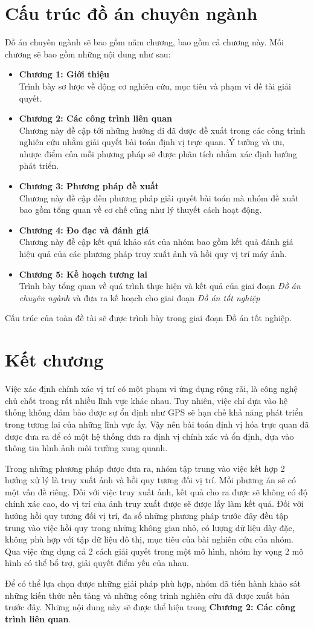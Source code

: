 \section{Cấu trúc đồ án chuyên ngành}
Đồ án chuyên ngành sẽ bao gồm năm chương, bao gồm cả chương này. Mỗi chương sẽ bao gồm những nội dung như sau:
\begin{itemize}
    \item \textbf{Chương 1: Giới thiệu} \\
    Trình bày sơ lược về động cơ nghiên cứu, mục tiêu và phạm vi đề tài giải quyết.
    \item \textbf{Chương 2: Các công trình liên quan} \\
    Chương này đề cập tới những hướng đi đã được đề xuất trong các công trình nghiên cứu nhằm giải quyết bài toán định vị trực quan. Ý tưởng và ưu, nhược điểm của mỗi phương pháp sẽ được phân tích nhằm xác định hướng phát triển.
    \item \textbf{Chương 3: Phương pháp đề xuất} \\
    Chương này đề cập đến phương pháp giải quyết bài toán mà nhóm đề xuất bao gồm tổng quan về cơ chế cũng như lý thuyết cách hoạt động.
    \item \textbf{Chương 4: Đo đạc và đánh giá} \\
    Chương này đề cập kết quả khảo sát của nhóm bao gồm kết quả đánh giá hiệu quả của các phương pháp truy xuất ảnh và hồi quy vị trí máy ảnh.
    \item \textbf{Chương 5: Kế hoạch tương lai} \\
    Trình bày tổng quan về quá trình thực hiện và kết quả của giai đoạn \textit{Đồ án chuyên ngành} và đưa ra kế hoạch cho giai đoạn \textit{Đồ án tốt nghiệp}
\end{itemize}
Cấu trúc của toàn đề tài sẽ được trình bày trong giai đoạn Đồ án tốt nghiệp.

\section{Kết chương}
Việc xác định chính xác vị trí có một phạm vi ứng dụng rộng rãi, là công nghệ chủ chốt trong rất nhiều lĩnh vực khác nhau. Tuy nhiên, việc chỉ dựa vào hệ thống không đảm bảo được sự ổn định như GPS sẽ hạn chế khả năng phát triển trong tương lai của những lĩnh vực ấy. Vậy nên bài toán định vị hóa trực quan đã được đưa ra để có một hệ thống đưa ra định vị chính xác và ổn định, dựa vào thông tin hình ảnh môi trường xung quanh.

Trong những phương pháp được đưa ra, nhóm tập trung vào việc kết hợp 2 hướng xử lý là truy xuất ảnh và hồi quy tương đối vị trí. Mỗi phương án sẽ có một vấn đề riêng. Đối với việc truy xuất ảnh, kết quả cho ra được sẽ không có độ chính xác cao, do vị trí của ảnh truy xuất được sẽ được lấy làm kết quả. Đối với hướng hồi quy tương đối vị trí, đa số những phương pháp trước đây đều tập trung vào việc hồi quy trong những không gian nhỏ, có lượng dữ liệu dày đặc, không phù hợp với tập dữ liệu đô thị, mục tiêu của bài nghiên cứu của nhóm. Qua việc ứng dụng cả 2 cách giải quyết trong một mô hình, nhóm hy vọng 2 mô hình có thể bổ trợ, giải quyết điểm yếu của nhau.

Để có thể lựa chọn được những giải pháp phù hợp, nhóm đã tiến hành khảo sát những kiến thức nền tảng và những công trình nghiên cứu đã được xuất bản trước đây. Những nội dung này sẽ được thể hiện trong \textbf{Chương 2: Các công trình liên quan}.